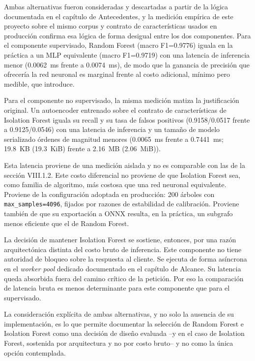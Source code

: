 Ambas alternativas fueron consideradas y descartadas a partir de la lógica documentada en el capítulo de Antecedentes, y la medición empírica de este proyecto sobre el mismo corpus y contrato de características usados en producción confirma esa lógica de forma desigual entre los dos componentes. Para el componente supervisado, Random Forest (macro F1=0.9776) iguala en la práctica a un MLP equivalente (macro F1=0.9719) con una latencia de inferencia menor (0.0062~ms frente a 0.0074~ms), de modo que la ganancia de precisión que ofrecería la red neuronal es marginal frente al costo adicional, mínimo pero medible, que introduce.

Para el componente no supervisado, la misma medición matiza la justificación original. Un autoencoder entrenado sobre el contrato de características de Isolation Forest iguala su recall y su tasa de falsos positivos (0.9158/0.0517 frente a 0.9125/0.0546) con una latencia de inferencia y un tamaño de modelo serializado órdenes de magnitud menores (0.0065~ms frente a 0.7441~ms; 19.8~KB (19.3~KiB) frente a 2.16~MB (2.06~MiB)).

Esta latencia proviene de una medición aislada y no es comparable con las de la sección VIII.1.2. Este costo diferencial no proviene de que Isolation Forest sea, como familia de algoritmo, más costosa que una red neuronal equivalente. Proviene de la configuración adoptada en producción: 200 árboles con \texttt{max\_samples=4096}, fijados por razones de estabilidad de calibración. Proviene también de que su exportación a ONNX resulta, en la práctica, un subgrafo menos eficiente que el de Random Forest.

La decisión de mantener Isolation Forest se sostiene, entonces, por una razón arquitectónica distinta del costo bruto de inferencia. Este componente no tiene autoridad de bloqueo sobre la respuesta al cliente. Se ejecuta de forma asíncrona en el \textit{worker pool} dedicado documentado en el capítulo de Alcance. Su latencia queda absorbida fuera del camino crítico de la petición. Por eso la comparación de latencia bruta es menos determinante para este componente que para el supervisado.

La consideración explícita de ambas alternativas, y no solo la ausencia de su implementación, es lo que permite documentar la selección de Random Forest e Isolation Forest como una decisión de diseño evaluada --y en el caso de Isolation Forest, sostenida por arquitectura y no por costo bruto-- y no como la única opción contemplada.

